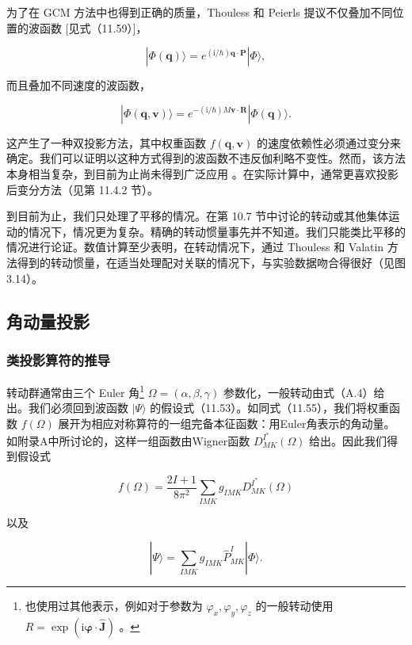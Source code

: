 为了在 GCM 方法中也得到正确的质量，Thouless 和 Peierls \cite{PT62} 提议不仅叠加不同位置的波函数
{[}见式（11.59）{]}，

\[
|\Phi(\boldsymbol{q})\rangle={e}^{(\mathrm{i}/\hbar)\boldsymbol{q}\cdot\boldsymbol{P}}|\Phi\rangle,\tag{11.108}
\]

而且叠加不同速度的波函数，

\[
|\Phi(\boldsymbol{q},\boldsymbol{v})\rangle=e^{-(\mathrm{i}/\hbar)M\boldsymbol{v}\cdot\boldsymbol{R}}|\Phi(\boldsymbol{q})\rangle.\tag{11.109}
\]

这产生了一种双投影方法，其中权重函数 $f\left({\boldsymbol{q},\boldsymbol{v}}\right)$
的速度依赖性必须通过变分来确定。我们可以证明以这种方式得到的波函数不违反伽利略不变性。然而，该方法本身相当复杂，到目前为止尚未得到广泛应用
\cite{Ba69b}。在实际计算中，通常更喜欢投影后变分方法（见第 11.4.2 节）。

到目前为止，我们只处理了平移的情况。在第 10.7 节中讨论的转动或其他集体运动的情况下，情况更为复杂。精确的转动惯量事先并不知道。我们只能类比平移的情况进行论证。数值计算至少表明，在转动情况下，通过
Thouless 和 Valatin 方法得到的转动惯量，在适当处理配对关联的情况下，与实验数据吻合得很好（见图 3.14）。

\subsection{角动量投影}

\subsubsection{类投影算符的推导}

转动群通常由三个 Euler 角\footnote{也使用过其他表示，例如对于参数为 $\varphi_{x},\varphi_{y},\varphi_{z}$ 的一般转动使用 $R=\exp(\mathrm{i}\boldsymbol{\varphi}\cdot\hat{\boldsymbol{J}})$
\cite{KO77}。} $\Omega=\left({\alpha,\beta,\gamma}\right)$ 参数化，一般转动由式（A.4）给出。我们必须回到波函数
$|\Psi\rangle$ 的假设式（11.53）。如同式（11.55），我们将权重函数 $f\left(\Omega\right)$
展开为相应对称算符的一组完备本征函数：用Euler角表示的角动量。如附录A中所讨论的，这样一组函数由Wigner函数 ${D}^{{I}^{*}}_{MK}\left(\Omega\right)$
给出。因此我们得到假设式

\[
f\left(\Omega\right)=\frac{{2I}+1}{8{\pi}^{2}}\mathop{\sum}\limits_{{IMK}}{g}_{IMK}{D}^{{I}^{*}}_{MK}\left(\Omega\right)\tag{11.110}
\]

以及

\[
|\Psi\rangle=\mathop{\sum}\limits_{IMK}g_{IMK}\widehat{P}^{I}_{MK}|\Phi\rangle.\tag{11.111}
\]

